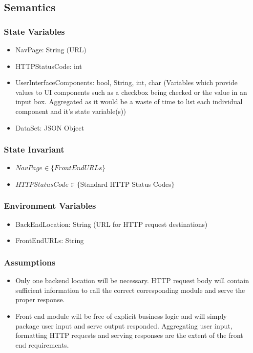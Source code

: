 \documentclass[12pt, titlepage]{article}
\begin{document}
\subsection{Semantics}

\subsubsection{State Variables}

\begin{itemize}
  \item{NavPage: String (URL)}
  \item{HTTPStatusCode: int}
  \item{UserInterfaceComponents: {bool, String, int, char} (Variables which provide values to UI components such as a checkbox being checked or the value
  in an input box. Aggregated as it would be a waste of time to list each individual component and it's state variable(s))}
  \item{DataSet: JSON Object}
\end{itemize}

\subsubsection{State Invariant}

\begin{itemize}
  \item{$NavPage \in \{FrontEndURLs\}$ }
  \item{$HTTPStatusCode \in \{$Standard HTTP Status Codes$\}$}
\end{itemize}

\subsubsection{Environment Variables}

  \begin{itemize}
    \item{BackEndLocation: String (URL for HTTP request destinations)}
    \item{FrontEndURLs: String{}}
  \end{itemize}

\subsubsection{Assumptions}

\begin{itemize}
  \item{Only one backend location will be necessary. HTTP request body will contain sufficient information to call the correct corresponding
  module and serve the proper response.}
  \item{Front end module will be free of explicit business logic and will simply package user input and serve output responded. Aggregating user input,
  formatting HTTP requests and serving responses are the extent of the front end requirements.}
\end{itemize}
\end{document}
